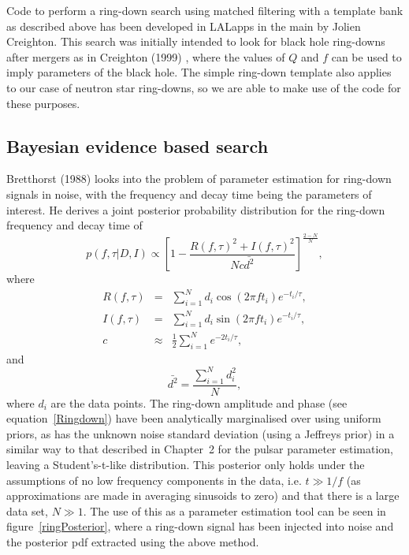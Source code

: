 Code to perform a ring-down search using matched filtering with a template bank as described
above has been developed in LALapps \cite{LALapps} in the main by Jolien Creighton. This search was
initially intended to look for black hole ring-downs after mergers as in Creighton (1999)
\cite{Creighton:1999}, where the values of $Q$ and $f$ can be used to imply parameters of the
black hole. The simple ring-down template also applies to our case of neutron star ring-downs, so we
are able to make use of the code for these purposes. 

\subsection{Bayesian evidence based search}
Bretthorst (1988) \cite{Bretthorst:1988} looks into the problem of parameter estimation for
ring-down signals in noise, with the frequency and decay time being the parameters of interest. He
derives a joint posterior probability distribution for the ring-down frequency and decay time of
\begin{equation}\label{RingPosterior}
p(f, \tau|D, I) \propto \left[1 - \frac{R(f, \tau)^2 + I(f, \tau)^2}{Nc\bar{d^2}}
\right]^{\frac{2-N}{N}},
\end{equation}
where
\begin{eqnarray}
R(f, \tau) & = & \sum_{i=1}^N d_i \cos{(2\pi{}ft_i)} e^{-t_i/\tau}, \\
I(f, \tau) & = & \sum_{i=1}^N d_i \sin{(2\pi{}ft_i)} e^{-t_i/\tau}, \\
c & \approx & \frac{1}{2}\sum_{i=1}^N e^{-2t_i/\tau},
\end{eqnarray}
and
\begin{equation}
\bar{d^2} = \frac{\sum_{i=1}^N d_i^2}{N},
\end{equation}
where $d_i$ are the data points. The ring-down amplitude and phase (see equation~\ref{Ringdown})
have been analytically marginalised over using uniform priors, as has the unknown noise standard
deviation (using a Jeffreys prior) in a similar way to that described in Chapter~2 for the pulsar
parameter estimation, leaving a Student's-t-like distribution. This posterior only holds under the
assumptions of no low frequency components in the data, i.e. $t \gg 1/f$ (as approximations are made
in averaging sinusoids to zero) and that there is a large data set, $N \gg 1$. The use of this as a
parameter estimation tool can be seen in figure~\ref{ringPosterior}, where a ring-down signal has
been injected into noise and the posterior pdf extracted using the above method.

